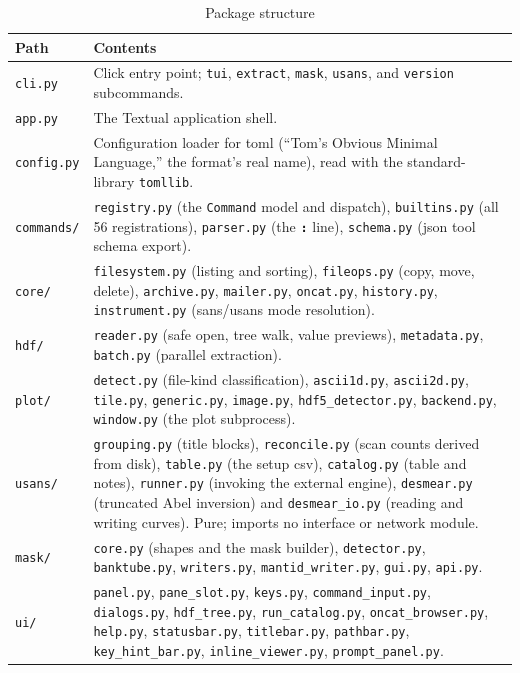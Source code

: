 \documentclass[tm]{ornltm}
\newcommand{\key}[1]{\textbf{\texttt{#1}}}
\begin{document}
\begin{table}[ht]
  \centering
  \caption{Package structure}
  \label{tab:layout}
  \small
  \begin{tabular}{l p{}}
    \toprule
    Path & Contents \\
    \midrule
    \texttt{cli.py} & Click entry point; \texttt{tui}, \texttt{extract},
      \texttt{mask}, \texttt{usans}, and \texttt{version} subcommands. \\
    \texttt{app.py} & The Textual application shell. \\
    \texttt{config.py} & Configuration loader for \ac{toml}
      \autocite{toml} (``Tom's Obvious Minimal Language,'' the format's real
      name), read with the standard-library \texttt{tomllib}. \\
    \texttt{commands/} & \texttt{registry.py} (the \texttt{Command} model and
      dispatch), \texttt{builtins.py} (all 56 registrations),
      \texttt{parser.py} (the \key{:} line), \texttt{schema.py} (\ac{json} tool
      schema export). \\
    \texttt{core/} & \texttt{filesystem.py} (listing and sorting),
      \texttt{fileops.py} (copy, move, delete), \texttt{archive.py},
      \texttt{mailer.py}, \texttt{oncat.py}, \texttt{history.py},
      \texttt{instrument.py} (\ac{sans}/\ac{usans} mode resolution). \\
    \texttt{hdf/} & \texttt{reader.py} (safe open, tree walk, value previews),
      \texttt{metadata.py}, \texttt{batch.py} (parallel extraction). \\
    \texttt{plot/} & \texttt{detect.py} (file-kind classification),
      \texttt{ascii1d.py}, \texttt{ascii2d.py}, \texttt{tile.py},
      \texttt{generic.py}, \texttt{image.py}, \texttt{hdf5\_detector.py},
      \texttt{backend.py}, \texttt{window.py} (the plot subprocess). \\
    \texttt{usans/} & \texttt{grouping.py} (title blocks), \texttt{reconcile.py}
      (scan counts derived from disk), \texttt{table.py} (the setup \ac{csv}),
      \texttt{catalog.py} (table and notes), \texttt{runner.py} (invoking the
      external engine), \texttt{desmear.py} (truncated Abel inversion) and
      \texttt{desmear\_io.py} (reading and writing curves). Pure; imports no
      interface or network module. \\
    \texttt{mask/} & \texttt{core.py} (shapes and the mask builder),
      \texttt{detector.py}, \texttt{banktube.py}, \texttt{writers.py},
      \texttt{mantid\_writer.py}, \texttt{gui.py}, \texttt{api.py}. \\
    \texttt{ui/} & \texttt{panel.py}, \texttt{pane\_slot.py},
      \texttt{keys.py}, \texttt{command\_input.py}, \texttt{dialogs.py},
      \texttt{hdf\_tree.py}, \texttt{run\_catalog.py},
      \texttt{oncat\_browser.py}, \texttt{help.py}, \texttt{statusbar.py},
      \texttt{titlebar.py}, \texttt{pathbar.py}, \texttt{key\_hint\_bar.py},
      \texttt{inline\_viewer.py}, \texttt{prompt\_panel.py}. \\
    \bottomrule
  \end{tabular}
\end{table}
\end{document}
